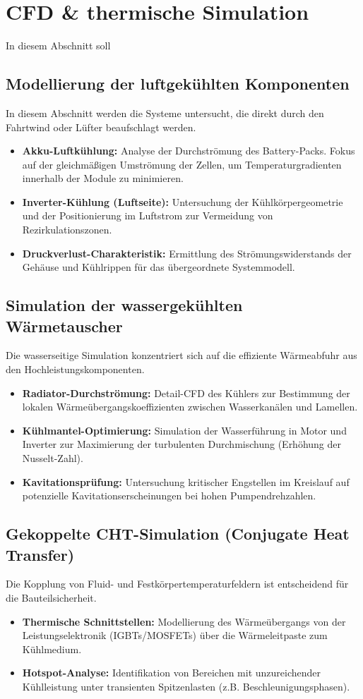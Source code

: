 \section{CFD \& thermische Simulation}
In diesem Abschnitt soll 


\subsection{Modellierung der luftgekühlten Komponenten}
In diesem Abschnitt werden die Systeme untersucht, die direkt durch den Fahrtwind oder Lüfter beaufschlagt werden.
\begin{itemize}
    \item \textbf{Akku-Luftkühlung:} Analyse der Durchströmung des Battery-Packs. Fokus auf der gleichmäßigen Umströmung der Zellen, um Temperaturgradienten innerhalb der Module zu minimieren.
    \item \textbf{Inverter-Kühlung (Luftseite):} Untersuchung der Kühlkörpergeometrie und der Positionierung im Luftstrom zur Vermeidung von Rezirkulationszonen.
    \item \textbf{Druckverlust-Charakteristik:} Ermittlung des Strömungswiderstands der Gehäuse und Kühlrippen für das übergeordnete Systemmodell.
\end{itemize}

\subsection{Simulation der wassergekühlten Wärmetauscher}
Die wasserseitige Simulation konzentriert sich auf die effiziente Wärmeabfuhr aus den Hochleistungskomponenten.
\begin{itemize}
    \item \textbf{Radiator-Durchströmung:} Detail-CFD des Kühlers zur Bestimmung der lokalen Wärmeübergangskoeffizienten zwischen Wasserkanälen und Lamellen.
    \item \textbf{Kühlmantel-Optimierung:} Simulation der Wasserführung in Motor und Inverter zur Maximierung der turbulenten Durchmischung (Erhöhung der Nusselt-Zahl).
    \item \textbf{Kavitationsprüfung:} Untersuchung kritischer Engstellen im Kreislauf auf potenzielle Kavitationserscheinungen bei hohen Pumpendrehzahlen.
\end{itemize}

\subsection{Gekoppelte CHT-Simulation (Conjugate Heat Transfer)}
Die Kopplung von Fluid- und Festkörpertemperaturfeldern ist entscheidend für die Bauteilsicherheit.
\begin{itemize}
    \item \textbf{Thermische Schnittstellen:} Modellierung des Wärmeübergangs von der Leistungselektronik (IGBTs/MOSFETs) über die Wärmeleitpaste zum Kühlmedium.
    \item \textbf{Hotspot-Analyse:} Identifikation von Bereichen mit unzureichender Kühlleistung unter transienten Spitzenlasten (z.B. Beschleunigungsphasen).
\end{itemize}

